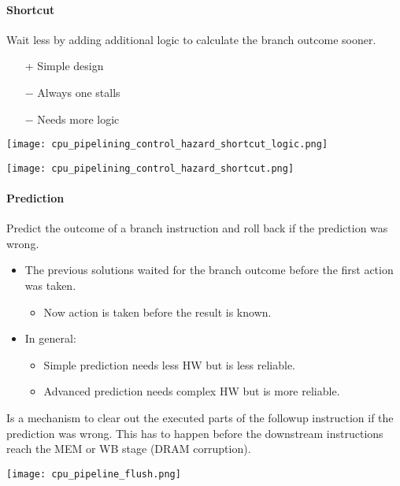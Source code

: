 \paragraph{Shortcut}\label{shortcut}

Wait less by adding additional logic to calculate the branch outcome sooner.

\begin{itemize}
    \item[+] Simple design
    \item[$-$] Always one stalls
    \item[$-$] Needs more logic
\end{itemize}

\texttt{[image: cpu\_pipelining\_control\_hazard\_shortcut\_logic.png]}

\texttt{[image: cpu\_pipelining\_control\_hazard\_shortcut.png]}

\paragraph{Prediction}\label{prediction}
Predict the outcome of a branch instruction and roll back if the prediction was wrong.
\begin{itemize}
    \item The previous solutions waited for the branch outcome before the first action was taken.
    \begin{itemize}
        \item Now action is taken before the result is known.
    \end{itemize}
    \item In general: 
    \begin{itemize}
        \item Simple prediction needs less HW but is less reliable.
        \item Advanced prediction needs complex HW but is more reliable.
    \end{itemize}
\end{itemize}

\newpar{}

Is a mechanism to clear out the executed parts of the followup instruction if the prediction was wrong. This has to happen before the downstream instructions reach the MEM or WB stage (DRAM corruption).
\begin{center}
    \texttt{[image: cpu\_pipeline\_flush.png]}
\end{center}
\newpar{}

